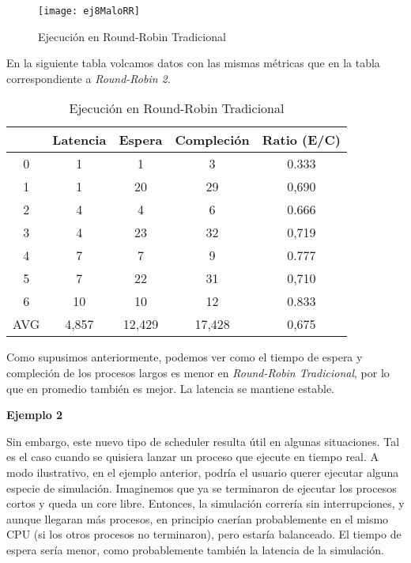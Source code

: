 \begin{figure}[h]
    \texttt{[image: ej8MaloRR]}
    \caption{Ejecución en Round-Robin Tradicional}
    \label{RRMalo}
\end{figure}

En la siguiente tabla volcamos datos con las mismas métricas que en la tabla correspondiente a \textit{Round-Robin 2}.

\begin{table}[h]
  \caption{Ejecución en Round-Robin Tradicional}
  \centering
    \begin{tabular}{c c c c c}
    \hline
          & Latencia & Espera & Compleción & Ratio (E/C) \\
    \hline
        0 &     1    &    1   &      3     &    0.333    \\
        1 &     1    &   20   &     29     &    0,690    \\
        2 &     4    &    4   &      6     &    0.666    \\
        3 &     4    &   23   &     32     &    0,719    \\
        4 &     7    &    7   &      9     &    0.777    \\
        5 &     7    &   22   &     31     &    0,710    \\
        6 &     10   &   10   &     12     &    0.833    \\
        AVG & 4,857  & 12,429 &   17,428   &    0,675    \\
    \end{tabular}
\end{table}

Como supusimos anteriormente, podemos ver como el tiempo de espera y compleción de los procesos largos es menor en \textit{Round-Robin Tradicional}, por lo que en promedio también es mejor. La latencia se mantiene estable.

\bigskip

\textbf{Ejemplo 2}

Sin embargo, este nuevo tipo de scheduler resulta útil en algunas situaciones. Tal es el caso cuando se quisiera lanzar un proceso que ejecute en tiempo real. A modo ilustrativo, en el ejemplo anterior, podría el usuario querer ejecutar alguna especie de simulación. Imaginemos que ya se terminaron de ejecutar los procesos cortos y queda un core libre. Entonces, la simulación correría sin interrupciones, y aunque llegaran más procesos, en principio caerían probablemente  en el mismo CPU (si los otros procesos no terminaron), pero estaría balanceado. El tiempo de espera sería menor, como probablemente también la latencia de la simulación.


